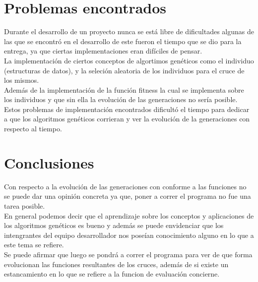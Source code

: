 \documentclass[10pt,a4paper]{article}
\begin{document}
\pagebreak
\section{Problemas encontrados}
Durante el desarrollo de un proyecto nunca se está libre de dificultades algunas de las que se encontró en el desarrollo de este fueron el tiempo que se dio para la entrega, ya que ciertas implementaciones eran difíciles de pensar. \\
La implementación de ciertos conceptos de algortimos genéticos
como el individuo (estructuras de datos), y la seleción aleatoria de los individuos para el cruce de los mismos.\\
Además de la implementación de la función fitness la cual se implementa sobre los individuos y que sin ella la evolución de las generaciones no sería posible.\\
Estos problemas de implementación encontrados dificultó el tiempo para dedicar a que los algoritmos genéticos corrieran y ver la evolución de la generaciones con respecto al tiempo.\\
\section{Conclusiones}
	Con respecto a la evolución de las generaciones con conforme a las funciones no se puede dar una opinión concreta ya que, poner a correr el programa no fue una tarea posible.\\
	En general podemos decir que el aprendizaje sobre los conceptos y aplicaciones de los algoritmos genéticos es bueno y además se puede envidenciar que los intengrantes del equipo desarrollador nos poseían conocimiento alguno en lo que a este tema se refiere.\\
	Se puede afirmar que luego se pondrá a correr el programa para ver de que forma evolucionan las funciones resultantes de los cruces, además de si existe un estancamiento en lo que se refiere a la funcion de evaluación concierne.\\
\end{document}
